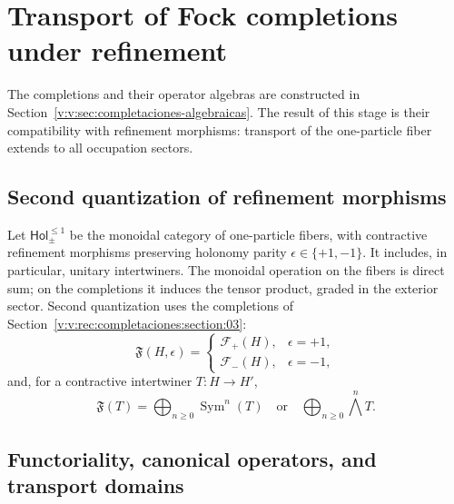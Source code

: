 \section{Transport of Fock completions under refinement}
\label{v:v:rec:fock_gibbs:section:01}

The completions and their operator algebras are constructed in
Section~\ref{v:v:sec:completaciones-algebraicas}. The result of this stage
is their compatibility with refinement morphisms: transport of
the one-particle fiber extends to all occupation sectors.

\subsection{Second quantization of refinement morphisms}
\label{v:v:rec:fock_gibbs:section:02}

Let \(\mathsf{Hol}_{\pm}^{\leq1}\) be the monoidal category of one-particle
fibers, with contractive refinement morphisms preserving
holonomy parity \(\epsilon\in\{+1,-1\}\). It includes, in particular,
unitary intertwiners. The monoidal operation on the fibers is
direct sum; on the completions it induces the tensor product,
graded in the exterior sector. Second quantization uses the
completions of Section~\ref{v:v:rec:completaciones:section:03}:
\[
 \mathfrak F(H,\epsilon)=
 \begin{cases}
 \mathcal F_+(H),
     &\epsilon=+1,\\[2mm]
 \mathcal F_-(H),
     &\epsilon=-1,
 \end{cases}
\]
and, for a contractive intertwiner \(T:H\to H'\),
\[
 \mathfrak F(T)=
 \bigoplus_{n\ge0}\operatorname{Sym}^n(T)
 \quad\text{or}\quad
 \bigoplus_{n\ge0}\bigwedge^n\!T.
\]

\subsection{Functoriality, canonical operators, and transport domains}
\label{v:v:rec:fock_gibbs:section:03}

